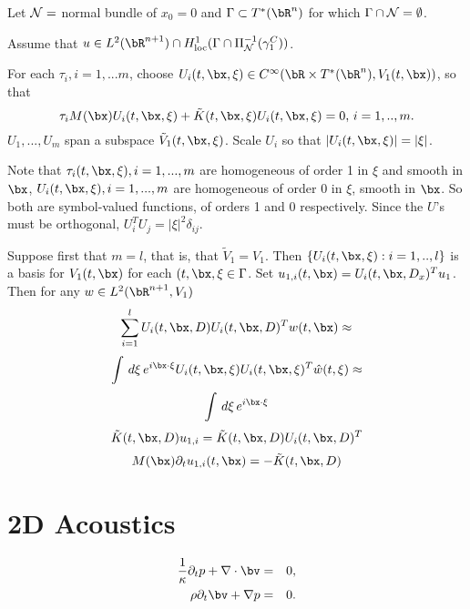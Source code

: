 Let ${\cal N} = $ normal bundle of $x_0=0$ and $\Gamma \subset T^*(\bR^n)$ for which $\Gamma \cap {\cal N} = \emptyset$.

Assume that $u \in L^2(\bR^{n+1}) \cap H^1_{\rm loc}(\Gamma \cap \Pi_{\cal N}^{-1}(\gamma_1^C))$.



For each $\tau_i, i =1,...m$, choose $U_i(t,\bx,\xi) \in C^{\infty}(\bR \times T^*(\bR^n),V_1(t,\bx))$,  so that
\[
  \tau_i M(\bx) U_i(t,\bx,\xi) + \tilde{K}(t,\bx,\xi) U_i(t,\bx,\xi)=0, \, i=1,..,m.
\]
$U_1,...,U_m$ span a subspace $\tilde{V}_1(t,\bx,\xi)$. Scale $U_i$ so that $|U_i(t,\bx,\xi)| = |\xi|$.

Note that $\tau_i(t,\bx,\xi), i=1,...,m$ are homogeneous of order 1 in $\xi$ and smooth in $\bx$, $U_i(t,\bx,\xi), i=1,...,m$ are homogeneous of order 0 in $\xi$, smooth in $\bx$. So both are symbol-valued functions, of orders 1 and 0 respectively. Since the $U$'s must be orthogonal, $U_i^TU_j = |\xi|^2\delta_{ij}$.

Suppose first that $m=l$, that is, that $\tilde{V}_1=V_1$. Then $\{U_i(t,\bx,\xi):i=1,..,l\}$ is a basis for $V_1(t,\bx)$ for each $(t,\bx,\xi \in \Gamma$. Set $u_{1,i}(t,\bx) = U_i(t,\bx,D_x)^Tu_1$. Then for any $w \in L^2(\bR^{n+1},V_1)$
\[
  \sum_{i=1}^l U_i(t,\bx,D)U_i(t,\bx,D)^Tw(t,\bx) \approx
\]
\[
  \int \, d\xi \, e^{i \bx \cdot \xi} U_i(t,\bx,\xi)U_i(t,\bx,\xi)^T\hat{w}(t,\xi) \approx
\]
\[
  \int \, d\xi \, e^{i \bx \cdot \xi}
\]
\[
  \tilde{K}(t,\bx,D)u_{1,i} = \tilde{K}(t,\bx,D)U_i(t,\bx,D)^T
\]
\[
  M(\bx)\partial_t u_{1,i}(t,\bx) = -\tilde{K}(t,\bx,D)
\]





\section{2D Acoustics}

\begin{eqnarray}
  \frac{1}{\kappa}\partial_t p + \nabla \cdot \bv & = & 0, \nonumber \\
  \rho \partial_t \bv + \nabla p & = & 0.
  \label{eqn:awe}                                     
\end{eqnarray}


